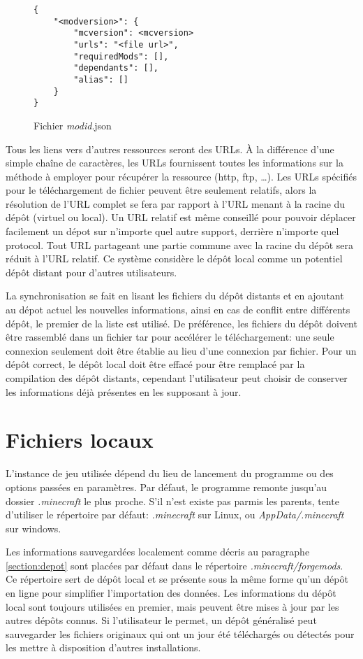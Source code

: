 \documentclass{article}
\begin{document}
\begin{figure}
\begin{verbatim}
{
    "<modversion>": {
        "mcversion": <mcversion>
        "urls": "<file url>",
        "requiredMods": [],
        "dependants": [],
        "alias": []
    }
}
\end{verbatim}
\caption{Fichier \textit{modid}.json}
\label{figure:modid.json}
\end{figure}


Tous les liens vers d'autres ressources seront des URLs.
À la différence d'une simple chaîne de caractères, les URLs fournissent toutes les informations sur la méthode à employer pour récupérer la ressource (http, ftp, \dots).
Les URLs spécifiés pour le téléchargement de fichier peuvent être seulement relatifs, alors la résolution de l'URL complet se fera par rapport à l'URL menant à la racine du dépôt (virtuel ou local).
Un URL relatif est même conseillé pour pouvoir déplacer facilement un dépot sur n'importe quel autre support, derrière n'importe quel protocol.
Tout URL partageant une partie commune avec la racine du dépôt sera réduit à l'URL relatif.
Ce système considère le dépôt local comme un potentiel dépôt distant pour d'autres utilisateurs.

La synchronisation se fait en lisant les fichiers du dépôt distants et en ajoutant au dépot actuel les nouvelles informations, ainsi en cas de conflit entre différents dépôt, le premier de la liste est utilisé.
De préférence, les fichiers du dépôt doivent être rassemblé dans un fichier tar pour accélérer le téléchargement: une seule connexion seulement doit être établie au lieu d'une connexion par fichier.
Pour un dépôt correct, le dépôt local doit être effacé pour être remplacé par la compilation des dépôt distants, cependant l'utilisateur peut choisir de conserver les informations déjà présentes en les supposant à jour.


\section{Fichiers locaux}
L'instance de jeu utilisée dépend du lieu de lancement du programme ou des options passées en paramètres.
Par défaut, le programme remonte jusqu'au dossier \textit{.minecraft} le plus proche.
S'il n'est existe pas parmis les parents, tente d'utiliser le répertoire par défaut: \textit{.minecraft} sur Linux, ou \textit{AppData/.minecraft} sur windows.

Les informations sauvegardées localement comme décris au paragraphe \ref{section:depot} sont placées par défaut dans le répertoire \textit{.minecraft/forgemods}.
Ce répertoire sert de dépôt local et se présente sous la même forme qu'un dépôt en ligne pour simplifier l'importation des données.
Les informations du dépôt local sont toujours utilisées en premier, mais peuvent être mises à jour par les autres dépôts connus.
Si l'utilisateur le permet, un dépôt généralisé peut sauvegarder les fichiers originaux qui ont un jour été téléchargés ou détectés pour les mettre à disposition d'autres installations.
\end{document}

